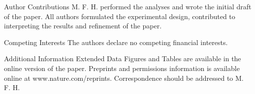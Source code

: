 \documentclass{nature}
\begin{document}
\begin{addendum}
		\item[Author Contributions] M. F. H. performed the analyses and wrote the initial draft of the paper. All authors formulated the experimental design, contributed to interpreting the results and refinement of the paper.
		
		\item[Competing Interests] The authors declare no competing financial interests.
		
		\item[Additional Information] Extended Data Figures and Tables are available in the online version of the paper. Preprints and permissions information is available online at www.nature.com/reprints. Correspondence should be addressed to M. F. H.
	\end{addendum}
	
\end{document}
